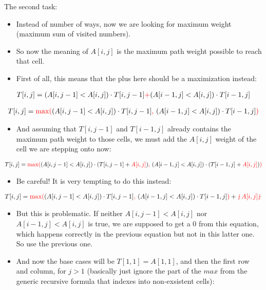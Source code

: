 The second task:

\begin{itemize}
    \item Instead of number of ways, now we are looking for maximum weight (maximum sum of visited numbers).
    \item So now the meaning of $A[i,j]$ is the maximum path weight possible to reach that cell.
    \item First of all, this means that the plus here should be a maximization instead:
\end{itemize}

\begin{align*}
T[i,j] = (A[i, j-1] < A[i,j]) \cdot{} T[i, j-1] \textcolor{red}{+} (A[i-1, j] < A[i,j]) \cdot{} T[i-1, j]
\end{align*}

\begin{align*}
T[i,j] = \textcolor{red}{\max(}(A[i, j-1] < A[i,j]) \cdot{} T[i, j-1] \textcolor{red}{,}~ (A[i-1, j] < A[i,j]) \cdot{} T[i-1, j] \textcolor{red}{)}
\end{align*}

\begin{itemize}
    \item And assuming that $T[i, j-1]$ and $T[i-1, j]$ already contains the maximum path weight to those cells, we must add the $A[i,j]$ weight of the cell we are stepping onto now:
\end{itemize}

\begin{align*}
T[i,j] = \textcolor{red}{\max(}(A[i, j-1] < A[i,j]) \cdot{} (T[i, j-1]+\textcolor{red}{A[i,j]}) \textcolor{red}{,}~ (A[i-1, j] < A[i,j]) \cdot{} (T[i-1, j]+\textcolor{red}{A[i,j]}) \textcolor{red}{)}
\end{align*}

\begin{itemize}
    \item Be careful! It is very tempting to do this instead:
\end{itemize}

\begin{align*}
T[i,j] = \textcolor{red}{\max(}(A[i, j-1] < A[i,j]) \cdot{} T[i, j-1] \textcolor{red}{,}~ (A[i-1, j] < A[i,j]) \cdot{} T[i-1, j] \textcolor{red}{)} +\textcolor{red}{\lightning} \textcolor{red}{A[i,j]} \textcolor{red}{\lightning}
\end{align*}

\begin{itemize}
    \item But this is problematic. If neither $A[i, j-1] < A[i,j]$ nor $A[i-1, j] < A[i,j]$ is true, we are supposed to get a $0$ from this equation, which happens correctly in the previous equation but not in this latter one. So use the previous one.
    \item And now the base cases will be $T[1,1] = A[1,1]$, and then the first row and column, for $j>1$ (basically just ignore the part of the $max$ from the generic recursive formula that indexes into non-exsistent cells):
\end{itemize}

